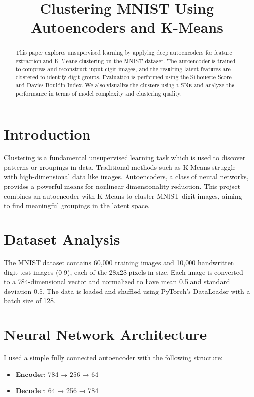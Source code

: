\documentclass[conference]{IEEEtran}
\title{Clustering MNIST Using Autoencoders and K-Means}
\author{\IEEEauthorblockN{Montasir Chowdhury Masrol}
\IEEEauthorblockA{Department of Computer Science\\
Brac University\\
Email: montasir.chowdhury.masrol@g.bracu.ac.bd}}
\begin{document}
\maketitle

\begin{abstract}
This paper explores unsupervised learning by applying deep autoencoders for feature extraction and K-Means clustering on the MNIST dataset. The autoencoder is trained to compress and reconstruct input digit images, and the resulting latent features are clustered to identify digit groups. Evaluation is performed using the Silhouette Score and Davies-Bouldin Index. We also visualize the clusters using t-SNE and analyze the performance in terms of model complexity and clustering quality.
\end{abstract}

\section{Introduction}
Clustering is a fundamental unsupervised learning task which is used to discover patterns or groupings in data. Traditional methods such as K-Means struggle with high-dimensional data like images. Autoencoders, a class of neural networks, provides a powerful means for nonlinear dimensionality reduction. This project combines an autoencoder with K-Means to cluster MNIST digit images, aiming to find meaningful groupings in the latent space. 

\section{Dataset Analysis}
The MNIST dataset contains 60,000 training images and 10,000 handwritten digit test images (0-9), each of the 28x28 pixels in size. Each image is converted to a 784-dimensional vector and normalized to have mean 0.5 and standard deviation 0.5. The data is loaded and shuffled using PyTorch's DataLoader with a batch size of 128.

\section{Neural Network Architecture}
I used a simple fully connected autoencoder with the following structure:

\begin{itemize}
    \item \textbf{Encoder}: 784 → 256 → 64
    \item \textbf{Decoder}: 64 → 256 → 784
\end{itemize}
\end{document}
